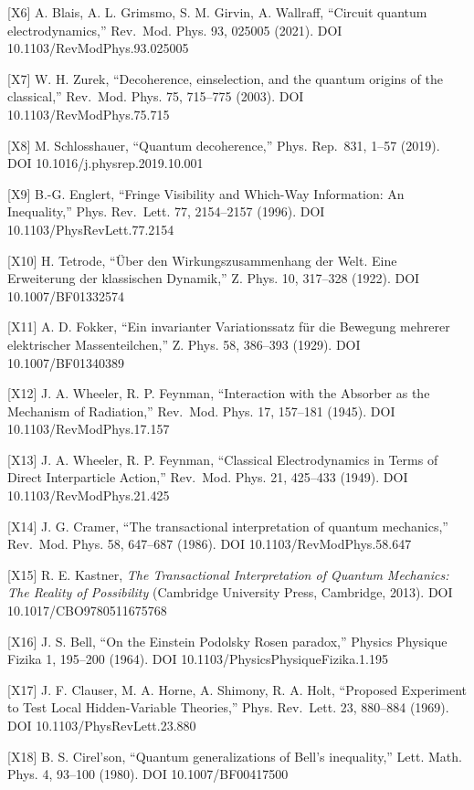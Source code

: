 \documentclass[
  a4paper,
]{ltjsarticle}
\begin{document}
{[}X6{]} A. Blais, A. L. Grimsmo, S. M. Girvin, A. Wallraff, ``Circuit
quantum electrodynamics,'' Rev.~Mod. Phys. 93, 025005 (2021). DOI
10.1103/RevModPhys.93.025005

{[}X7{]} W. H. Zurek, ``Decoherence, einselection, and the quantum
origins of the classical,'' Rev.~Mod. Phys. 75, 715--775 (2003). DOI
10.1103/RevModPhys.75.715

{[}X8{]} M. Schlosshauer, ``Quantum decoherence,'' Phys. Rep.~831, 1--57
(2019). DOI 10.1016/j.physrep.2019.10.001

{[}X9{]} B.-G. Englert, ``Fringe Visibility and Which-Way Information:
An Inequality,'' Phys. Rev.~Lett. 77, 2154--2157 (1996). DOI
10.1103/PhysRevLett.77.2154

{[}X10{]} H. Tetrode, ``Über den Wirkungszusammenhang der Welt. Eine
Erweiterung der klassischen Dynamik,'' Z. Phys. 10, 317--328 (1922). DOI
10.1007/BF01332574

{[}X11{]} A. D. Fokker, ``Ein invarianter Variationssatz für die
Bewegung mehrerer elektrischer Massenteilchen,'' Z. Phys. 58, 386--393
(1929). DOI 10.1007/BF01340389

{[}X12{]} J. A. Wheeler, R. P. Feynman, ``Interaction with the Absorber
as the Mechanism of Radiation,'' Rev.~Mod. Phys. 17, 157--181 (1945).
DOI 10.1103/RevModPhys.17.157

{[}X13{]} J. A. Wheeler, R. P. Feynman, ``Classical Electrodynamics in
Terms of Direct Interparticle Action,'' Rev.~Mod. Phys. 21, 425--433
(1949). DOI 10.1103/RevModPhys.21.425

{[}X14{]} J. G. Cramer, ``The transactional interpretation of quantum
mechanics,'' Rev.~Mod. Phys. 58, 647--687 (1986). DOI
10.1103/RevModPhys.58.647

{[}X15{]} R. E. Kastner, \emph{The Transactional Interpretation of
Quantum Mechanics: The Reality of Possibility} (Cambridge University
Press, Cambridge, 2013). DOI 10.1017/CBO9780511675768

{[}X16{]} J. S. Bell, ``On the Einstein Podolsky Rosen paradox,''
Physics Physique Fizika 1, 195--200 (1964). DOI
10.1103/PhysicsPhysiqueFizika.1.195

{[}X17{]} J. F. Clauser, M. A. Horne, A. Shimony, R. A. Holt, ``Proposed
Experiment to Test Local Hidden-Variable Theories,'' Phys. Rev.~Lett.
23, 880--884 (1969). DOI 10.1103/PhysRevLett.23.880

{[}X18{]} B. S. Cirel'son, ``Quantum generalizations of Bell's
inequality,'' Lett. Math. Phys. 4, 93--100 (1980). DOI
10.1007/BF00417500
\end{document}
